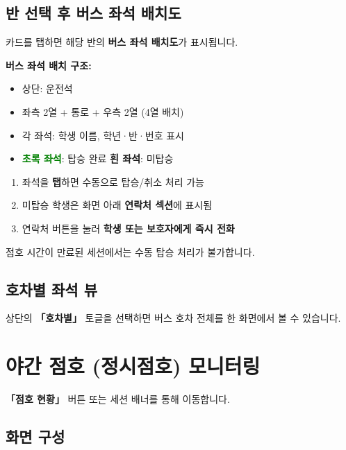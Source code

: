 \documentclass[a4paper,11pt]{article}
\begin{document}
\subsection{반 선택 후 버스 좌석 배치도}

카드를 탭하면 해당 반의 \textbf{버스 좌석 배치도}가 표시됩니다.

\begin{tcolorbox}[infobox]
\textbf{버스 좌석 배치 구조:}
\begin{itemize}
  \item 상단: 운전석
  \item 좌측 2열 + 통로 + 우측 2열 (4열 배치)
  \item 각 좌석: 학생 이름, 학년·반·번호 표시
  \item \textcolor{green}{\textbf{초록 좌석}}: 탑승 완료 \quad \textbf{흰 좌석}: 미탑승
\end{itemize}
\end{tcolorbox}

\begin{enumerate}
  \item 좌석을 \textbf{탭}하면 수동으로 탑승/취소 처리 가능
  \item 미탑승 학생은 화면 아래 \textbf{연락처 섹션}에 표시됨
  \item 연락처 버튼을 눌러 \textbf{학생 또는 보호자에게 즉시 전화}
\end{enumerate}

\begin{tcolorbox}[warnbox]
점호 시간이 만료된 세션에서는 수동 탑승 처리가 불가합니다.
\end{tcolorbox}

\subsection{호차별 좌석 뷰}

상단의 \textbf{「호차별」} 토글을 선택하면 버스 호차 전체를 한 화면에서 볼 수 있습니다.

\section{야간 점호 (정시점호) 모니터링}

\textbf{「점호 현황」} 버튼 또는 세션 배너를 통해 이동합니다.

\subsection{화면 구성}
\end{document}
